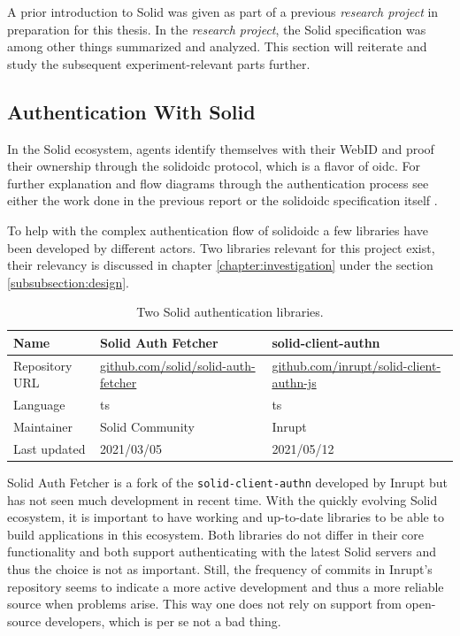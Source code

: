 A prior introduction to Solid was given as part of a previous \textit{research project} \cite{cern-solid-investigation-spec} in preparation for this thesis. In the \textit{research project}, the Solid specification was among other things summarized and analyzed. This section will reiterate and study the subsequent experiment-relevant parts further.

\subsection{Authentication With Solid}

In the Solid ecosystem, agents identify themselves with their WebID and proof their ownership through the \gls{solidoidc} protocol, which is a flavor of \gls{oidc}. For further explanation and flow diagrams through the authentication process see either the work done in the previous report \cite{cern-solid-investigation-spec} or the \gls{solidoidc} specification itself \cite{solid-ecosystem-oidc}.

To help with the complex authentication flow of \gls{solidoidc} a few libraries have been developed by different actors. Two libraries relevant for this project exist, their relevancy is discussed in chapter \ref{chapter:investigation} under the section \ref{subsubsection:design}.

\begin{table}[h!]
    \centering
    \begin{tabular}{| l | l | l |} 
     \hline
     Name & Solid Auth Fetcher & solid-client-authn \\
     \hline
     Repository URL & \url{github.com/solid/solid-auth-fetcher} & \url{github.com/inrupt/solid-client-authn-js} \\
     \hline
     Language & \gls{ts} & \gls{ts} \\
     \hline
     Maintainer & Solid Community & Inrupt \\
     \hline
     Last updated & 2021/03/05 & 2021/05/12 \\
     \hline
    \end{tabular}
    \vspace{0.75cm}
    \caption{Two Solid authentication libraries.}
    \label{table:0}
\end{table}

Solid Auth Fetcher is a fork of the \texttt{solid-client-authn} developed by Inrupt but has not seen much development in recent time. With the quickly evolving Solid ecosystem, it is important to have working and up-to-date libraries to be able to build applications in this ecosystem. Both libraries do not differ in their core functionality and both support authenticating with the latest Solid servers and thus the choice is not as important. Still, the frequency of commits in Inrupt's repository seems to indicate a more active development and thus a more reliable source when problems arise. This way one does not rely on support from open-source developers, which is per se not a bad thing.

